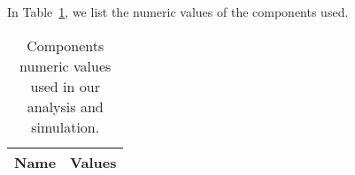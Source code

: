 In Table~\ref{tab:data}, we list the numeric values of the components used.

\begin{table}[h]
  \centering
  \begin{tabular}{|l|r|}
    \hline    
    {\bf Name} & {\bf Values} \\ \hline
     
  \end{tabular}
  \caption{Components numeric values used in our analysis and simulation.}
  \label{tab:data}
\end{table}
